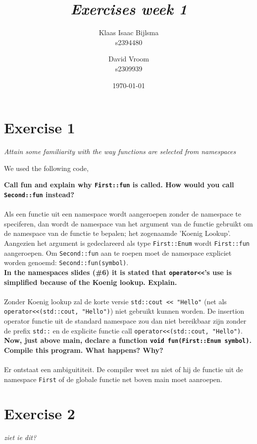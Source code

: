 \documentclass[12pt]{article}
\title{\itshape Exercises week 1}
\author{
	Klaas Isaac Bijlsma \\ s2394480
	\and
	David Vroom \\ s2309939
}
\date{\today}
\newcommand{\desc}[1]{\textit{#1} \vspace{1em}}
\begin{document}
\maketitle

\section*{Exercise 1}
\desc{Attain some familiarity with the way functions are selected from namespaces}

We used the following code,


\textbf{Call fun and explain why \texttt{First::fun} is called. How would you call \texttt{Second::fun} instead?}\\
\\
Als een functie uit een namespace wordt aangeroepen zonder de namespace te speciferen, dan wordt de namespace van het argument van de functie gebruikt om de namespace van de functie te bepalen; het zogenaamde 'Koenig Lookup'. Aangezien het argument is gedeclareerd als type \texttt{First::Enum} wordt \texttt{First::fun} aangeroepen. Om \texttt{Second::fun} aan te roepen moet de namespace expliciet worden genoemd: \texttt{Second::fun(symbol)}.\\

\textbf{In the namespaces slides (\#6) it is stated that \texttt{operator<<}'s use is simplified because of the Koenig lookup. Explain.}\\
\\
Zonder Koenig lookup zal de korte versie \texttt{std::cout << "Hello"} (net als\\ \texttt{operator<<(std::cout, "Hello")}) niet gebruikt kunnen worden. De insertion operator functie uit de standard namespace zou dan niet bereikbaar zijn zonder de prefix \texttt{std::} en de explicite functie call \texttt{operator<<(std::cout, "Hello")}. \\

\textbf{Now, just above main, declare a function \texttt{void fun(First::Enum symbol)}. Compile this program. What happens? Why?}\\
\\
Er ontstaat een ambiguititeit. De compiler weet nu niet of hij de functie uit de namespace \texttt{First} of de globale functie net boven main moet aanroepen.


\clearpage
\section*{Exercise 2}
\desc{ziet ie dit?}
\end{document}
